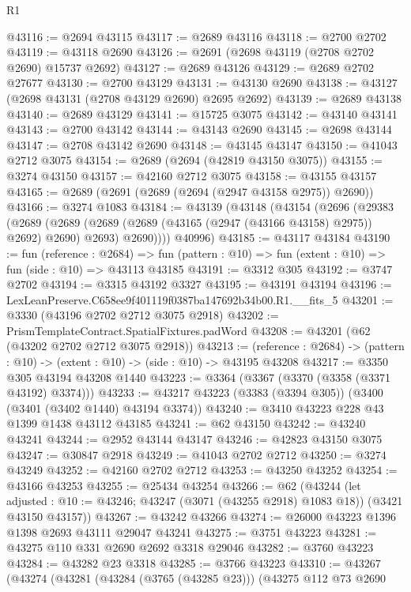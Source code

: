 \begin{lexlean}{R1}
\begin{coremodule}
@43116 := @2694 @43115
@43117 := @2689 @43116
@43118 := @2700 @2702
@43119 := @43118 @2690
@43126 := @2691 (@2698 @43119 (@2708 @2702 @2690) @15737 @2692)
@43127 := @2689 @43126
@43129 := @2689 @2702 @27677
@43130 := @2700 @43129
@43131 := @43130 @2690
@43138 := @43127 (@2698 @43131 (@2708 @43129 @2690) @2695 @2692)
@43139 := @2689 @43138
@43140 := @2689 @43129
@43141 := @15725 @3075
@43142 := @43140 @43141
@43143 := @2700 @43142
@43144 := @43143 @2690
@43145 := @2698 @43144
@43147 := @2708 @43142 @2690
@43148 := @43145 @43147
@43150 := @41043 @2712 @3075
@43154 := @2689 (@2694 (@42819 @43150 @3075))
@43155 := @3274 @43150
@43157 := @42160 @2712 @3075
@43158 := @43155 @43157
@43165 := @2689 (@2691 (@2689 (@2694 (@2947 @43158 @2975)) @2690))
@43166 := @3274 @1083
@43184 := @43139
    (@43148
      (@43154
        (@2696
          (@29383
            (@2689
              (@2689 (@2689 (@2689 (@43165 (@2947 (@43166 @43158) @2975)) @2692) @2690) @2693)
              @2690))))
      @40996)
@43185 := @43117 @43184
@43190 := fun (reference : @2684) =>
  fun (pattern : @10) => fun (extent : @10) => fun (side : @10) => @43113 @43185
@43191 := @3312 @305
@43192 := @3747 @2702
@43194 := @3315 @43192 @3327
@43195 := @43191 @43194
@43196 := LexLeanPreserve.C658ee9f401119f0387ba147692b34b00.R1.__fits_5
@43201 := @3330 (@43196 @2702 @2712 @3075 @2918)
@43202 := PrismTemplateContract.SpatialFixtures.padWord
@43208 := @43201 (@62 (@43202 @2702 @2712 @3075 @2918))
@43213 := (reference : @2684) -> (pattern : @10) -> (extent : @10) -> (side : @10) -> @43195 @43208
@43217 := @3350 @305 @43194 @43208 @1440
@43223 := @3364 (@3367 (@3370 (@3358 (@3371 @43192) @3374)))
@43233 := @43217 @43223 (@3383 (@3394 @305)) (@3400 (@3401 (@3402 @1440) @43194 @3374))
@43240 := @3410 @43223 @228 @43 @1399 @1438 @43112 @43185
@43241 := @62 @43150
@43242 := @43240 @43241
@43244 := @2952 @43144 @43147
@43246 := @42823 @43150 @3075
@43247 := @30847 @2918
@43249 := @41043 @2702 @2712
@43250 := @3274 @43249
@43252 := @42160 @2702 @2712
@43253 := @43250 @43252
@43254 := @43166 @43253
@43255 := @25434 @43254
@43266 := @62
    (@43244
      (let adjusted : @10 := @43246; @43247 (@3071 (@43255 @2918) @1083 @18))
      (@3421 @43150 @43157))
@43267 := @43242 @43266
@43274 := @26000 @43223 @1396 @1398 @2693 @43111 @29047 @43241
@43275 := @3751 @43223
@43281 := @43275 @110 @331 @2690 @2692 @3318 @29046
@43282 := @3760 @43223
@43284 := @43282 @23 @3318
@43285 := @3766 @43223
@43310 := @43267
    (@43274
      (@43281
        (@43284 (@3765 (@43285 @23)))
        (@43275
          @112
          @73
          @2690

\end{coremodule}
\end{lexlean}
